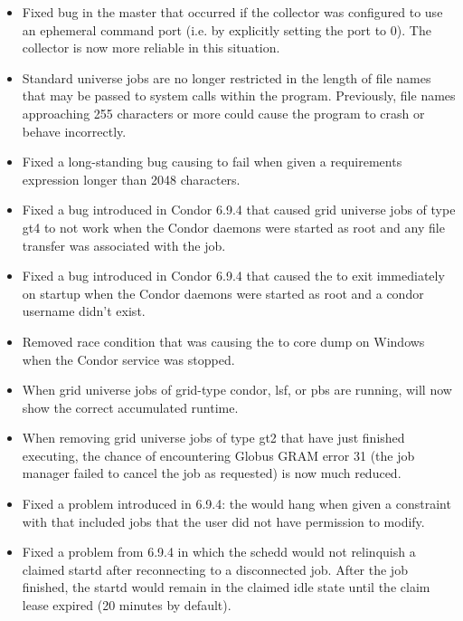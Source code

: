 \begin{itemize}
\item Fixed bug in the master that occurred if the collector
	was configured to use an ephemeral command port 
	(i.e. by explicitly setting the port to 0).	  The collector
	is now more reliable in this situation.

\item Standard universe jobs are no longer restricted in the length of
file names that may be passed to system calls within the program.
Previously, file names approaching 255 characters or more could
cause the program to crash or behave incorrectly.

\item Fixed a long-standing bug causing  to fail when
given a requirements expression longer than 2048 characters.

\item Fixed a bug introduced in Condor 6.9.4 that caused grid universe
jobs of type gt4 to not work when the Condor daemons were started as
root and any file transfer was associated with the job.

\item Fixed a bug introduced in Condor 6.9.4 that caused the
 to exit immediately on startup when the Condor
daemons were started as root and a condor username didn't exist.

\item Removed race condition that was causing the  to core
  dump on Windows when the Condor service was stopped.

\item When grid universe jobs of grid-type condor, lsf, or pbs are running,
 will now show the correct accumulated runtime.

\item When removing grid universe jobs of type gt2 that have just finished
executing, the chance of encountering Globus GRAM error 31 (the job manager
failed to cancel the job as requested) is now much reduced.

\item Fixed a problem introduced in 6.9.4: the  would hang
when given a constraint with  that included jobs that the user
did not have permission to modify.

\item Fixed a problem from 6.9.4 in which the schedd would not
relinquish a claimed startd after reconnecting to a disconnected job.
After the job finished, the startd would remain in the claimed idle
state until the claim lease expired (20 minutes by default).


\end{itemize}
